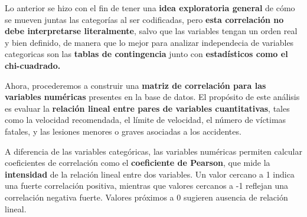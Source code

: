 \documentclass[
  letterpaper,
  DIV=11,
  numbers=noendperiod]{scrartcl}
\begin{document}
Lo anterior se hizo con el fin de tener una \textbf{idea exploratoria
general} de cómo se mueven juntas las categorías al ser codificadas,
pero \textbf{esta correlación no debe interpretarse literalmente}, salvo
que las variables tengan un orden real y bien definido, de manera que lo
mejor para analizar independecia de variables categoricas son las
\textbf{tablas de contingencia} junto con \textbf{estadísticos como el
chi-cuadrado.}

Ahora, procederemos a construir una \textbf{matriz de correlación para
las variables numéricas} presentes en la base de datos. El propósito de
este análisis es evaluar la \textbf{relación lineal entre pares de
variables cuantitativas}, tales como la velocidad recomendada, el límite
de velocidad, el número de víctimas fatales, y las lesiones menores o
graves asociadas a los accidentes.

A diferencia de las variables categóricas, las variables numéricas
permiten calcular coeficientes de correlación como el
\textbf{coeficiente de Pearson}, que mide la \textbf{intensidad} de la
relación lineal entre dos variables. Un valor cercano a 1 indica una
fuerte correlación positiva, mientras que valores cercanos a -1 reflejan
una correlación negativa fuerte. Valores próximos a 0 sugieren ausencia
de relación lineal.
\end{document}
